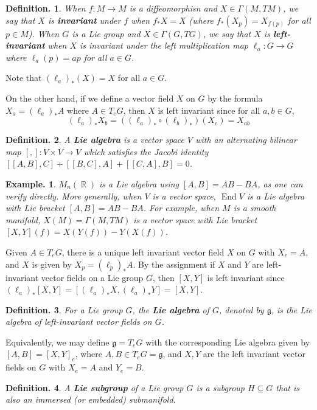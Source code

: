 \documentclass[11pt, a4paper]{memoir}
\DeclareMathOperator{\R}{{\mathbb{R}}}
\theoremstyle{change}
\theoremstyle{plain}
\theoremstyle{nonumberplain}
\newtheorem{definition}{Definition.}
\newtheorem{example}{Example.}
\DeclareMathOperator{\End}{End}
\numberwithin{equation}{section}
\begin{document}
\begin{definition}
    When $f:M\to M$ is a diffeomorphisn and $X\in \Gamma(M,TM)$, we say that $X$ is \textbf{invariant} under $f$ when $f_*X=X$ (where $f_*(X_p)=X_{f(p)}$ for all $p\in M$).
    When $G$ is a Lie group and $X\in\Gamma(G,TG)$, we say that $X$ is \textbf{left-invariant} when $X$ is invariant under the left multiplication map $\ell_a:G\to G$ where $\ell_a(p)=ap$ for all $a\in G$.
\end{definition}
Note that $(\ell_a)_*(X)=X$ for all $a\in G$.

On the other hand, if we define a vector field $X$ on $G$ by the formula $X_a=(\ell_a)_*A$ where $A\in T_eG$, then $X$ is left invariant since for all $a,b\in G$,
\begin{equation*}
    (\ell_a)_*X_b=((\ell_a)_*\circ(\ell_b)_*)(X_e)=X_{ab}
\end{equation*}
\begin{definition}
    A \textbf{Lie algebra} is a vector space $V$ with an alternating bilinear map $[,]:V\times V\to V$ which satisfies the Jacobi identity $[[A,B],C]+[[B,C],A]+[[C,A],B]=0$.
\end{definition}
\begin{example}
    $M_n(\R)$ is a Lie algebra using $[A,B]=AB-BA$, as one can verify directly.
    More generally, when $V$ is a vector space, $\End V$ is a Lie algebra with Lie bracket $[A,B]=AB-BA$.
    For example, when $M$ is a smooth manifold, $X(M)=\Gamma(M,TM)$ is a vector space with Lie bracket $[X,Y](f)=X(Y(f))-Y(X(f))$.
\end{example}
Given $A\in T_eG$, there is a unique left invariant vector field $X$ on $G$ with $X_e=A$, and $X$ is given by $X_p=(\ell_p)_{*}A$.
By the assignment if $X$ and $Y$ are left-invariant vector fields on a Lie group $G$, then $[X,Y]$ is left invariant since $(\ell_a)_*[X,Y]=[(\ell_a)_*X,(\ell_a)_*Y]=[X,Y]$.
\begin{definition}
    For a Lie group $G$, the \textbf{Lie algebra} of $G$, denoted by $\mathfrak{g}$, is the Lie algebra of left-invariant vector fields on $G$.
\end{definition}
Equivalently, we may define $\mathfrak{g}=T_eG$ with the corresponding Lie algebra given by $[A,B]=[X,Y]_e$, where $A,B\in T_eG=\mathfrak{g}$, and $X,Y$ are the left invariant vector fields on $G$ with $X_e=A$ and $Y_e=B$.
\begin{definition}
    A \textbf{Lie subgroup} of a Lie group $G$ is a subgroup $H\subseteq G$ that is also an immersed (or embedded) submanifold.
\end{definition}
\end{document}

